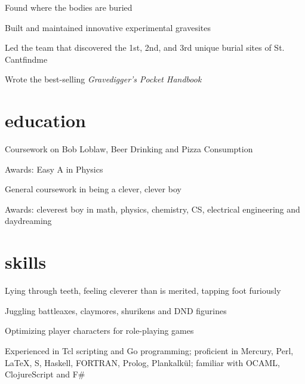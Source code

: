 \documentclass{resume}
\begin{document}
%
\begin{position}
	\begin{compactitem}
		\item
			Found where the bodies are buried
		\item
			Built and maintained innovative experimental gravesites
		\item
			Led the team that discovered the 1st, 2nd, and 3rd unique burial sites of St. Cantfindme
		\item
			Wrote the best-selling \emph{Gravedigger's Pocket Handbook}
	\end{compactitem}
\end{position}
%
%
\section{education}
\begin{school}
	\begin{compactitem}
		\item
			Coursework on Bob Loblaw, Beer Drinking and Pizza Consumption
		\item
			Awards: Easy A in Physics
	\end{compactitem}
\end{school}
%
\begin{school}
	\begin{compactitem}
		\item
			General coursework in being a clever, clever boy
		\item
			Awards: cleverest boy in math, physics, chemistry, CS, electrical engineering and daydreaming
	\end{compactitem}
\end{school}
%
\section{skills}
	\begin{compactitem}
		\item
			Lying through teeth, feeling cleverer than is merited, tapping foot furiously
		\item
			Juggling battleaxes, claymores, shurikens and DND figurines
		\item
			Optimizing player characters for role-playing games
		\item
			Experienced in Tcl scripting and Go programming; proficient in Mercury, Perl, {\large\LaTeX}, S, Haskell, FORTRAN, Prolog, Plankalk\"{u}l; familiar with OCAML, ClojureScript and F\#
	\end{compactitem}
%
\end{document}
